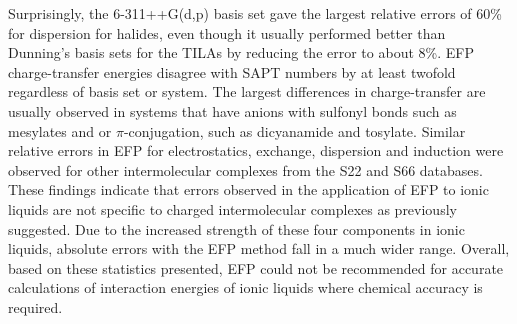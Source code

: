 Surprisingly, the 6-311++G(d,p) basis set gave the largest relative errors of 60\% for dispersion for halides, even though it usually performed better than Dunning's basis sets for the TILAs by reducing the error to about 8\%.
EFP charge-transfer energies disagree with SAPT numbers by at least twofold regardless of basis set or system. 
The largest differences in charge-transfer are usually observed in systems that have anions with sulfonyl bonds such as mesylates and \ntf or $\pi$-conjugation, such as dicyanamide and tosylate.
Similar relative errors in EFP for electrostatics, exchange, dispersion and induction were observed for other intermolecular complexes from the S22 and S66 databases.
\cite{Flick2012a}
These findings indicate that errors observed in the application of EFP to ionic liquids are not specific to charged intermolecular complexes as previously suggested.
Due to the increased strength of these four components in ionic liquids, absolute errors with the EFP method fall in a much wider range.
Overall, based on these statistics presented, EFP could not be recommended for accurate calculations of interaction energies of ionic liquids where chemical accuracy is required.




